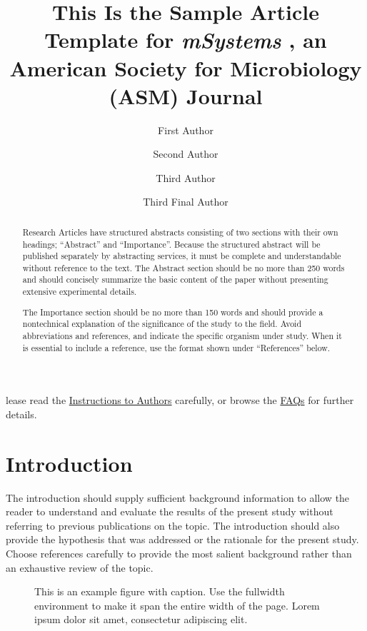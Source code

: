 \documentclass[
  lineno]{asm}
\title{This Is the Sample Article Template for \emph{mSystems}
\textsuperscript{\textregistered}, an American Society for Microbiology
(ASM) Journal}
\author[1]
  {First Author \orcidlink{0000-0000-0000-0000}}
\author[1]
  {Second Author }
\author[2]
  {Third Author }
\author[1,2,\textdagger]
  {Third Final Author }
\affil[1]{University Name, Faculty Group, Department, City, Country}
\affil[2]{Company Name, City, Country}
\renewcommand{\figurename}{FIG}
\renewcommand*\figurename{Figure}
\newcommand\figurename{Figure}
\renewcommand*\tablename{Table}
\newcommand\tablename{Table}
\begin{document}
\maketitle

\begin{abstract}
Research Articles have structured abstracts consisting of two sections
with their own headings; ``Abstract'' and ``Importance''. Because the
structured abstract will be published separately by abstracting
services, it must be complete and understandable without reference to
the text. The Abstract section should be no more than 250 words and
should concisely summarize the basic content of the paper without
presenting extensive experimental details.
\begin{importance}
The Importance section should be no more than 150 words and should
provide a nontechnical explanation of the significance of the study to
the field. Avoid abbreviations and references, and indicate the specific
organism under study. When it is essential to include a reference, use
the format shown under ``References'' below.
\end{importance}
\end{abstract}

\infobox

\renewcommand{\figurename}{FIG}
\renewcommand{\tablename}{TABLE}

lease read the
\href{https://journals.asm.org/journal/msystems/submission-review-process}{Instructions
to Authors} carefully, or browse the
\href{https://journals.asm.org/journal/msystems/faq}{FAQs} for further
details.

\section{Introduction}\label{sec-intro}

The introduction should supply sufficient background information to
allow the reader to understand and evaluate the results of the present
study without referring to previous publications on the topic. The
introduction should also provide the hypothesis that was addressed or
the rationale for the present study. Choose references carefully to
provide the most salient background rather than an exhaustive review of
the topic.

\begin{figure}


\caption{\label{fig-example}This is an example figure with caption. Use
the fullwidth environment to make it span the entire width of the page.
Lorem ipsum dolor sit amet, consectetur adipiscing elit.}

\end{figure}%
\end{document}

